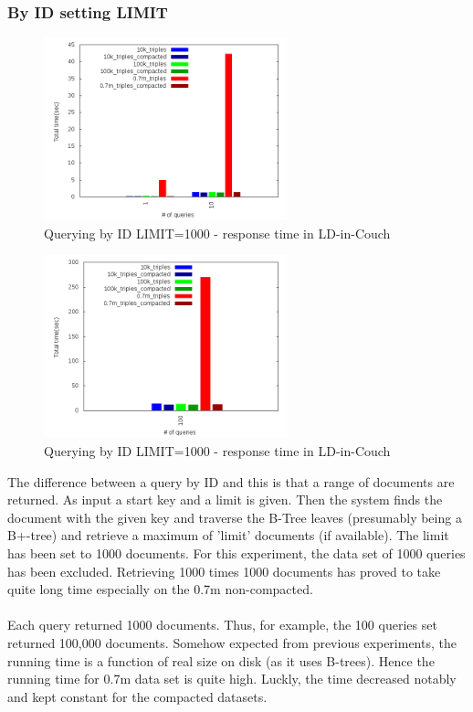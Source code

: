 \documentclass[a4paper,10pt]{article}
\begin{document}
\subsubsection{By ID setting LIMIT}
\begin{figure}[h!]
  \centering
  \includegraphics[height=200px]{../couchdb/plots/plot_q_time_id_range.png}
  \caption{Querying by ID LIMIT=1000 - response time in LD-in-Couch}
\end{figure}
\begin{figure}[h!]
  \centering
  \includegraphics[height=200px]{../couchdb/plots/plot_q_time_id_range_100.png}
  \caption{Querying by ID LIMIT=1000 - response time in LD-in-Couch}
\end{figure}
The difference between a query by ID and this is that a range of documents are returned. As input a start key and a limit is given. Then 
the system finds the document with the given key and traverse the B-Tree leaves (presumably being a B+-tree) and retrieve a maximum of 
'limit' documents (if available). The limit has been set to 1000 documents. 
For this experiment, the data set of 1000 queries has been excluded. Retrieving 1000 times 1000 documents has proved to take quite long time 
especially on the 0.7m non-compacted.
\paragraph{}
Each query returned 1000 documents. Thus, for example, the 100 queries set returned 100,000 documents. 
Somehow expected from previous experiments, the running time is a function of real size on disk (as it uses B-trees). Hence the 
running time for 0.7m data set is quite high. Luckly, the time decreased notably and kept constant for the compacted 
datasets. 
\end{document}
